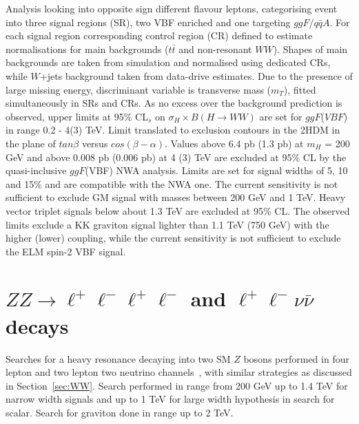 \documentclass{PoS}
\begin{document}
Analysis looking into opposite sign different flavour leptons, categorising event into three signal regions (SR), two VBF enriched and one targeting $ggF/q\bar{q}A$. For each signal region corresponding control region (CR) defined to estimate normalisations for main backgrounds ($t\bar{t}$ and non-resonant $WW$). 
Shapes of main backgrounds are taken from simulation and normalised using dedicated CRs, while $W$+jets background taken from data-drive estimates.
Due to the presence of large missing energy, discriminant variable is transverse mass ($m_T$), fitted simultaneously in SRs and CRs. 
As no excess over the background prediction is observed, upper limits at 95\% CL$_s$ on $\sigma_H \times B(H\rightarrow WW)$ are set for $ggF$($VBF$) in range 0.2 - 4(3) TeV. Limit translated to exclusion contours in the 2HDM in the plane of $tan \beta$ versus $cos(\beta-\alpha)$.
 Values above 6.4 pb (1.3 pb) at $m_H$ = 200 GeV and above 0.008 pb (0.006 pb) at 4 (3) TeV are excluded at 95\% CL by the quasi-inclusive $ggF$(VBF) NWA analysis.
Limits are set for signal widths of 5, 10 and 15\% and are compatible with the NWA one.
The current sensitivity is not sufficient to exclude GM signal with masses between 200 GeV and 1 TeV.
Heavy vector triplet signals below about 1.3 TeV are excluded at 95\% CL. 
The observed limits exclude a KK graviton signal lighter than 1.1 TeV (750 GeV) with the higher (lower) coupling, while the current sensitivity is not sufficient to exclude the ELM spin-2 VBF signal. 

\section{$ZZ\rightarrow \ell^+\ell^-\ell^+\ell^-$ and $\ell^+\ell^-\nu\bar{\nu}$ decays} %
\label{sec:ZZ}
Searches for a heavy resonance decaying into two SM $Z$ bosons performed in four lepton and two lepton two neutrino channels~\cite{HIGG-2016-19}, with similar strategies as discussed in Section~\ref{sec:WW}. Search performed in range from 200 GeV up to 1.4 TeV for narrow width signals and up to 1 TeV for large width hypothesis in search for scalar. Search for graviton done in range up to 2 TeV.
\end{document}
